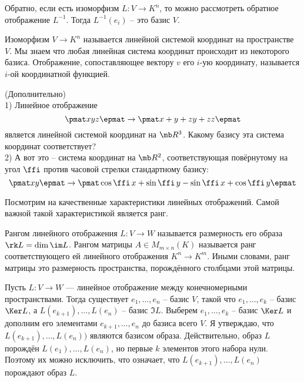 Обратно, если есть изоморфизм $L\colon V \to K^n$, то можно рассмотреть обратное отображение $L^{-1}$. Тогда $L^{-1}(e_i)$ -- это базис $V$.
\endproof
\ecrl




\dfn
Изоморфизм  $V \to K^n$ называется линейной системой координат на пространстве $V$. Мы знаем что любая линейная система координат происходит из некоторого базиса. Отображение, сопоставляющее вектору $v$ его $i$-ую координату, называется $i$-ой координатной функцией. 
\edfn



\exm(Дополнительно) \\
1) Линейное отображение $$\pmat x\\y\\z \epmat \to \pmat x+y+z\\ y+z\\z \epmat $$
является линейной системой координат на $\mb R^3$.  Какому базису эта система координат  соответствует?\\
2) А вот это -- система координат на $\mb R^2$, соответствующая  повёрнутому на угол $\ffi$ против часовой стрелки стандартному базису:
$$\pmat x\\ y \epmat \to \pmat \cos \ffi\, x + \sin \ffi\, y\\ -\sin\ffi\, x+ \cos \ffi\, y \epmat 
$$


Посмотрим на качественные характеристики линейных отображений. Самой важной такой характеристикой является ранг.





\dfn Рангом линейного отображения $L\colon V \to W$ называется размерность его образа $\rk L= \dim \im L$. Рангом матрицы $A\in M_{m\times n}(K)$ называется ранг соответствующего ей линейного отображения $K^n \to K^m$. Иными словами, ранг матрицы это размерность пространства, порождённого столбцами этой матрицы.
\edfn


Пусть $L\colon V \to W$ --- линейное отображение между конечномерными пространствами. Тогда существует $e_1,\dots,e_n$ -- базис $V$, такой что $e_1,\dots,e_k$ -- базис $\Ker L$, а $L(e_{k+1}),\dots,L(e_n)$ -- базис $\Im L$.
\ethrm
\proof Выберем $e_1,\dots, e_k$ -- базис $\Ker L$ и дополним его элементами $e_{k+1},\dots,e_n$ до базиса всего $V$. Я утверждаю, что $L(e_{k+1}),\dots,L(e_n))$ являются базисом образа. Действительно, образ $L$ порождён $L(e_1),\dots, L(e_n)$, но первые $k$ элементов этого набора нули. Поэтому их можно исключить, что означает, что $L(e_{k+1}), \dots, L(e_n)$ порождают образ $L$.

